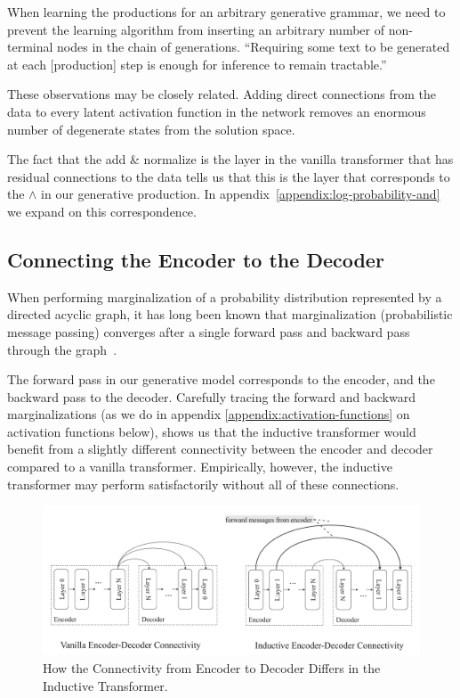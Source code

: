 \documentclass{article}
\begin{document}
When learning the productions for an arbitrary generative grammar, we need to prevent the learning algorithm from inserting an arbitrary number of non-terminal nodes in the chain of generations. ``Requiring
some text to be generated at each [production] step is enough for inference to remain tractable.''~\citep{malik2021generative}

These observations may be closely related.  Adding direct connections from the data to every latent activation function in the network removes an enormous number of degenerate states from the solution space.

The fact that the add \& normalize is the layer in the vanilla transformer that has residual connections to the data tells us that this is the layer that corresponds to the $\land$ in our generative production.  In appendix~\ref{appendix:log-probability-and} we expand on this correspondence.


\subsection{Connecting the Encoder to the Decoder}
\label{appendix:connecting-encoder-to-decoder}

When performing marginalization of a probability distribution represented by a directed acyclic graph, it has long been known that marginalization (probabilistic message passing) converges after a single forward pass and backward pass through the graph~\citep{pearl1988probabilistic, mackay2003information}.

The forward pass in our generative model corresponds to the encoder, and the backward pass to the decoder. Carefully tracing the forward and backward marginalizations (as we do in appendix \ref{appendix:activation-functions} on activation functions below), shows us that the inductive transformer would benefit from a slightly different connectivity between the encoder and decoder compared to a vanilla transformer.  Empirically, however, the inductive transformer may perform satisfactorily without all of these connections.

\begin{figure}[H]
\centering
\includegraphics[width=\textwidth]{figures/inductive-encoder-decoder-connectivity.pdf}
\caption{How the Connectivity from Encoder to Decoder Differs in the Inductive Transformer.}
\label{fig:logical-encoder-decoder}
\end{figure}
\end{document}
